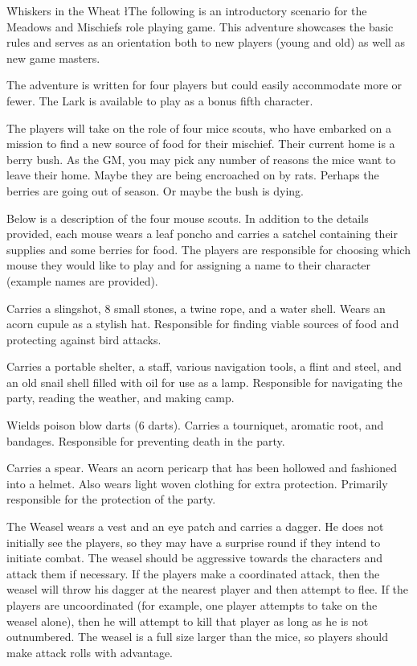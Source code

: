 \documentclass{novel}
\title     {\gamename}
\subtitle  {The Role Playing Game}
\newcommand{\gamename}{Meadows and Mischiefs}
\begin{document}
\toc

\h{Whiskers in the Wheat}
\l{T}he following is an introductory scenario for the \gamename{} role playing game. This adventure showcases the basic rules and serves as an orientation both to new players (young and old) as well as new game masters.

The adventure is written for four players but could easily accommodate more or fewer. The Lark is available to play as a bonus fifth character.

The players will take on the role of four mice scouts, who have embarked on a mission to find a new source of food for their mischief. Their current home is a berry bush. As the GM, you may pick any number of reasons the mice want to leave their home. Maybe they are being encroached on by rats. Perhaps the berries are going out of season. Or maybe the bush is dying.

Below is a description of the four mouse scouts. In addition to the details provided, each mouse wears a leaf poncho and carries a satchel containing their supplies and some berries for food. The players are responsible for choosing which mouse they would like to play and for assigning a name to their character (example names are provided).

Carries a slingshot, 8 small stones, a twine rope, and a water shell. Wears an acorn cupule as a stylish hat. Responsible for finding viable sources of food and protecting against bird attacks.

Carries a portable shelter, a staff, various navigation tools, a flint and steel, and an old snail shell filled with oil for use as a lamp. Responsible for navigating the party, reading the weather, and making camp.

Wields poison blow darts (6 darts). Carries a tourniquet, aromatic root, and bandages. Responsible for preventing death in the party.

Carries a spear. Wears an acorn pericarp that has been hollowed and fashioned into a helmet. Also wears light woven clothing for extra protection. Primarily responsible for the protection of the party.

The Weasel wears a vest and an eye patch and carries a dagger. He does not initially see the players, so they may have a surprise round if they intend to initiate combat. The weasel should be aggressive towards the characters and attack them if necessary. If the players make a coordinated attack, then the weasel will throw his dagger at the nearest player and then attempt to flee. If the players are uncoordinated (for example, one player attempts to take on the weasel alone), then he will attempt to kill that player as long as he is not outnumbered. The weasel is a full size larger than the mice, so players should make attack rolls with advantage.
\end{document}
